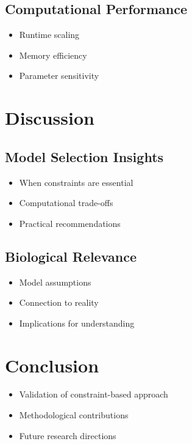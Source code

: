 \documentclass[conference]{IEEEtran}
\begin{document}
\newpage

\subsection{Computational Performance}
\begin{itemize}
    \item Runtime scaling
    \item Memory efficiency
    \item Parameter sensitivity
\end{itemize}

\newpage
\section{Discussion}
\subsection{Model Selection Insights}
\begin{itemize}
    \item When constraints are essential
    \item Computational trade-offs
    \item Practical recommendations
\end{itemize}

\newpage

\subsection{Biological Relevance}
\begin{itemize}
    \item Model assumptions
    \item Connection to reality
    \item Implications for understanding
\end{itemize}

\newpage

\section{Conclusion}
\begin{itemize}
    \item Validation of constraint-based approach
    \item Methodological contributions
    \item Future research directions
\end{itemize}



\end{document}
